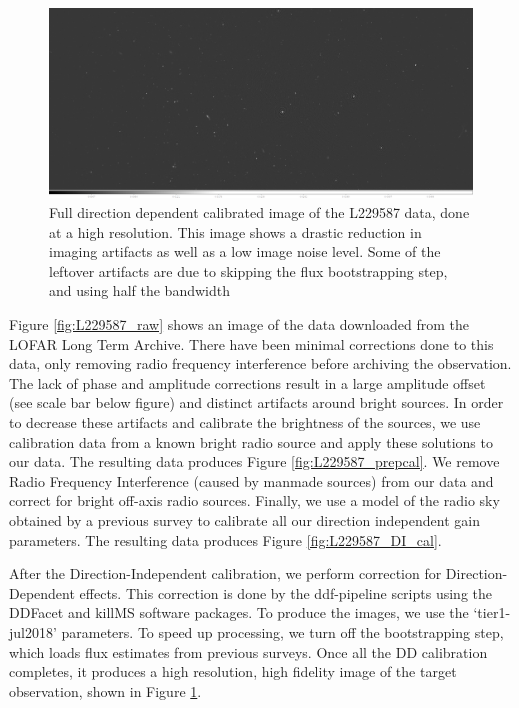\begin{figure}[!htb]
    \centering
    \includegraphics[width=.8\linewidth]{background/figures/full_ampphase_brighter.jpeg}
    \caption[Fully calibrated image]{Full direction dependent calibrated image of the L229587 data, done at a high resolution. This image shows a drastic reduction in imaging artifacts as well as a low image noise level. Some of the leftover artifacts are due to skipping the flux bootstrapping step, and using half the bandwidth}
    \label{fig:L229587_full_high}
\end{figure}

%


Figure \ref{fig:L229587_raw} shows an image of the data downloaded from the LOFAR Long Term Archive. There have been minimal corrections done to this data, only removing radio frequency interference before archiving the observation. The lack of phase and amplitude corrections result in a large amplitude offset (see scale bar below figure) and distinct artifacts around bright sources. In order to decrease these artifacts and calibrate the brightness of the sources, we use calibration data from a known bright radio source and apply these solutions to our data.  The resulting data produces Figure \ref{fig:L229587_prepcal}. We remove Radio Frequency Interference (caused by manmade sources) from our data and correct for bright off-axis radio sources. Finally, we use a model of the radio sky obtained by a previous survey to calibrate all our direction independent gain parameters. The resulting data produces Figure \ref{fig:L229587_DI_cal}.

After the Direction-Independent calibration, we perform correction for Direction-Dependent effects. This correction is done by the ddf-pipeline scripts using the DDFacet and killMS software packages. To produce the images, we use the `tier1-jul2018' parameters. To speed up processing, we turn off the bootstrapping step, which loads flux estimates from previous surveys\citep{hardcastle2016}. Once all the DD calibration completes, it produces a high resolution, high fidelity image of the target observation, shown in Figure \ref{fig:L229587_full_high}.

